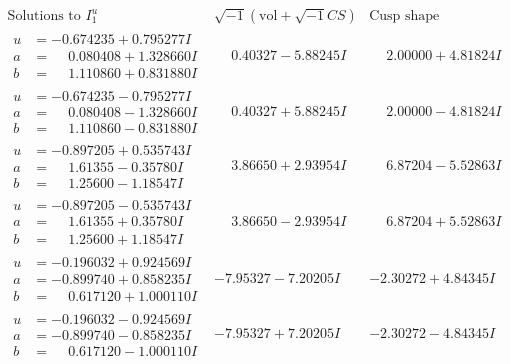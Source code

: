 \documentclass[1p]{elsarticle_modified}
\theoremstyle{definition}
\newcommand{\I}{\sqrt{-1}}
\begin{document}
$$\begin{array}{c|c|c}  
\text{Solutions to }I^u_{1}& \I (\text{vol} + \sqrt{-1}CS) & \text{Cusp shape}\\
 \hline 
\begin{aligned}
u &= -0.674235 + 0.795277 I \\
a &= \phantom{-}0.080408 + 1.328660 I \\
b &= \phantom{-}1.110860 + 0.831880 I\end{aligned}
 & \phantom{-}0.40327 - 5.88245 I & \phantom{-}2.00000 + 4.81824 I \\ \hline\begin{aligned}
u &= -0.674235 - 0.795277 I \\
a &= \phantom{-}0.080408 - 1.328660 I \\
b &= \phantom{-}1.110860 - 0.831880 I\end{aligned}
 & \phantom{-}0.40327 + 5.88245 I & \phantom{-}2.00000 - 4.81824 I \\ \hline\begin{aligned}
u &= -0.897205 + 0.535743 I \\
a &= \phantom{-}1.61355 - 0.35780 I \\
b &= \phantom{-}1.25600 - 1.18547 I\end{aligned}
 & \phantom{-}3.86650 + 2.93954 I & \phantom{-}6.87204 - 5.52863 I \\ \hline\begin{aligned}
u &= -0.897205 - 0.535743 I \\
a &= \phantom{-}1.61355 + 0.35780 I \\
b &= \phantom{-}1.25600 + 1.18547 I\end{aligned}
 & \phantom{-}3.86650 - 2.93954 I & \phantom{-}6.87204 + 5.52863 I \\ \hline\begin{aligned}
u &= -0.196032 + 0.924569 I \\
a &= -0.899740 + 0.858235 I \\
b &= \phantom{-}0.617120 + 1.000110 I\end{aligned}
 & -7.95327 - 7.20205 I & -2.30272 + 4.84345 I \\ \hline\begin{aligned}
u &= -0.196032 - 0.924569 I \\
a &= -0.899740 - 0.858235 I \\
b &= \phantom{-}0.617120 - 1.000110 I\end{aligned}
 & -7.95327 + 7.20205 I & -2.30272 - 4.84345 I \\ \hline\begin{aligned}

\end{aligned}
\end{array}$$
\end{document}
